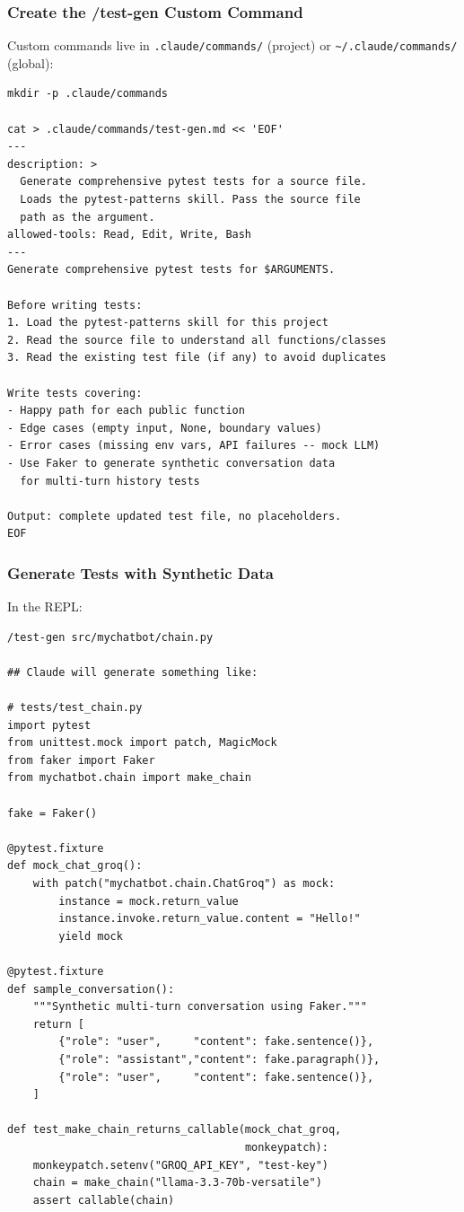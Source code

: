 \begin{frame}[fragile]\frametitle{Create the /test-gen Custom Command}
Custom commands live in \texttt{.claude/commands/} (project) or \texttt{\~{}/.claude/commands/} (global):

\begin{lstlisting}
mkdir -p .claude/commands

cat > .claude/commands/test-gen.md << 'EOF'
---
description: >
  Generate comprehensive pytest tests for a source file.
  Loads the pytest-patterns skill. Pass the source file
  path as the argument.
allowed-tools: Read, Edit, Write, Bash
---
Generate comprehensive pytest tests for $ARGUMENTS.

Before writing tests:
1. Load the pytest-patterns skill for this project
2. Read the source file to understand all functions/classes
3. Read the existing test file (if any) to avoid duplicates

Write tests covering:
- Happy path for each public function
- Edge cases (empty input, None, boundary values)
- Error cases (missing env vars, API failures -- mock LLM)
- Use Faker to generate synthetic conversation data
  for multi-turn history tests

Output: complete updated test file, no placeholders.
EOF
\end{lstlisting}
\end{frame}


\begin{frame}[fragile]\frametitle{Generate Tests with Synthetic Data}
In the REPL:
\begin{lstlisting}
/test-gen src/mychatbot/chain.py

## Claude will generate something like:

# tests/test_chain.py
import pytest
from unittest.mock import patch, MagicMock
from faker import Faker
from mychatbot.chain import make_chain

fake = Faker()

@pytest.fixture
def mock_chat_groq():
    with patch("mychatbot.chain.ChatGroq") as mock:
        instance = mock.return_value
        instance.invoke.return_value.content = "Hello!"
        yield mock

@pytest.fixture
def sample_conversation():
    """Synthetic multi-turn conversation using Faker."""
    return [
        {"role": "user",     "content": fake.sentence()},
        {"role": "assistant","content": fake.paragraph()},
        {"role": "user",     "content": fake.sentence()},
    ]

def test_make_chain_returns_callable(mock_chat_groq,
                                     monkeypatch):
    monkeypatch.setenv("GROQ_API_KEY", "test-key")
    chain = make_chain("llama-3.3-70b-versatile")
    assert callable(chain)
\end{lstlisting}
\end{frame}


